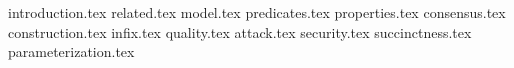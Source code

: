 {introduction.tex}
{related.tex}
{model.tex}
{predicates.tex}
{properties.tex}
{consensus.tex}
{construction.tex}
{infix.tex}
{quality.tex}
{attack.tex}
{security.tex}
{succinctness.tex}
{parameterization.tex}

